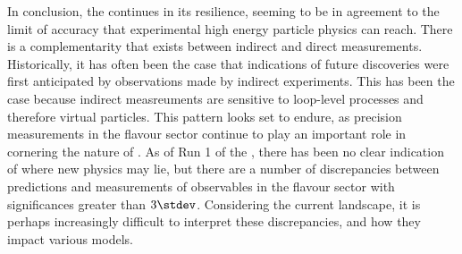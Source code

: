 
In conclusion, the \sm continues in its resilience, seeming to be in agreement to the limit of
accuracy that experimental high energy particle physics can reach.
There is a complementarity that exists between indirect and direct measurements.
Historically, it has often been the case that indications of future discoveries were first
anticipated by observations made by indirect experiments.
This has been the case because indirect measreuments are sensitive to loop-level processes and
therefore virtual particles.
This pattern looks set to endure,
as precision measurements in the flavour sector continue to play an important role in
cornering the nature of \np.
As of Run 1 of the \lhc, there has been no clear indication of where new physics may lie,
but there are a number of discrepancies between \sm predictions and measurements of observables in
the flavour sector with significances greater than $3\stdev$.
Considering the current landscape, it is perhaps increasingly difficult to interpret these
discrepancies, and how they impact various \np models.




